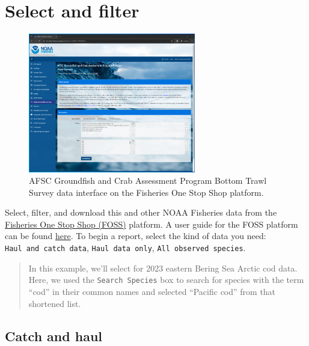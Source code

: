 \documentclass[
  letterpaper,
  oneside,
  open=any]{scrbook}
\begin{document}
\section{Select and filter}\label{select-and-filter}

\begin{figure}[H]

{\centering \includegraphics[width=2.87in,height=\textheight]{content/../img/foss_1_interface.png}

}

\caption{AFSC Groundfish and Crab Assessment Program Bottom Trawl Survey
data interface on the Fisheries One Stop Shop platform.}

\end{figure}%

Select, filter, and download this and other NOAA Fisheries data from the
\href{https://www.fisheries.noaa.gov/foss}{Fisheries One Stop Shop
(FOSS)} platform. A user guide for the FOSS platform can be found
\href{https://www.fisheries.noaa.gov/foss/f?p=215:7:7542600605674:::::}{here}.
To begin a report, select the kind of data you need:
\texttt{Haul\ and\ catch\ data}, \texttt{Haul\ data\ only},
\texttt{All\ observed\ species}.

\begin{quote}
In this example, we'll select for 2023 eastern Bering Sea Arctic cod
data. Here, we used the \texttt{Search\ Species} box to search for
species with the term ``cod'' in their common names and selected
``Pacific cod'' from that shortened list.
\end{quote}

\subsection{Catch and haul}\label{catch-and-haul}
\end{document}
